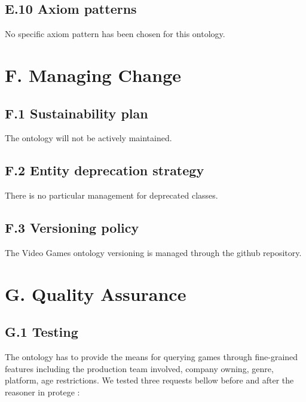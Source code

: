 \documentclass{article}
\begin{document}
\subsection*{E.10 Axiom patterns }

No specific axiom pattern has been chosen for this ontology.

\section*{F. Managing Change}
\subsection*{F.1 Sustainability plan}
The ontology will not be actively maintained. 
\subsection*{F.2 Entity deprecation strategy }
There is no particular management for deprecated classes. 
\subsection*{F.3 Versioning policy}
The Video Games ontology versioning is managed through the github repository. 
\section*{G. Quality Assurance}
\subsection*{G.1 Testing}
The ontology has to provide the means for querying games through fine-grained features including the production team involved, company owning, genre, platform, age restrictions. We tested three requests bellow before and after the reasoner in protege : 
\end{document}
